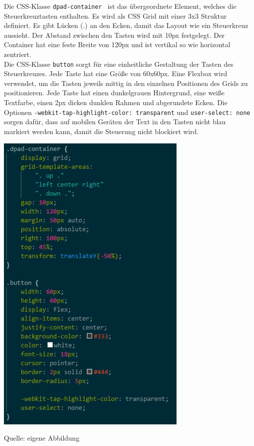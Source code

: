 \documentclass[ngerman,12pt,a4paper]{article}
\begin{document}
	Die CSS-Klasse \texttt{dpad-container } ist das übergeordnete Element, welches die Steuerkreuztasten enthalten. Es wird als CSS Grid mit einer 3x3 Struktur definiert. Es gibt Lücken (.) an den Ecken, damit das Layout wie ein Steuerkreuz aussieht. Der Abstand zwischen den Tasten wird mit 10px festgelegt. Der Container hat eine feste Breite von 120px und ist vertikal so wie horizontal zentriert. \\[0.5cm]
	Die CSS-Klasse \texttt{button} sorgt für eine einheitliche Gestaltung der Tasten des Steuerkreuzes. Jede Taste hat eine Größe von 60x60px. Eine Flexbox wird verwendet, um die Tasten jeweils mittig in den einzelnen Positionen des Grids zu positionieren. Jede Taste hat einen dunkelgrauen Hintergrund, eine weiße Textfarbe, einen 2px dicken dunklen Rahmen und abgerundete Ecken. Die Optionen \texttt{-webkit-tap-highlight-color: transparent} und \texttt{user-select: none} sorgen dafür, dass auf mobilen Geräten der Text in den Tasten nicht blau markiert werden kann, damit die Steuerung nicht blockiert wird. 
	\begin{center}
		\begin{minipage}[t]{0.55\textwidth}
			\includegraphics[scale=0.9]{Pictures/Steuerung-css1}
			\label{fig:Steuerkreuz-css1}
			\vspace{-10pt}
			\begin{center}
				\par\small Quelle: eigene Abbildung 
			\end{center}
		\end{minipage} \\[0.75cm]
	\end{center}
\end{document}
